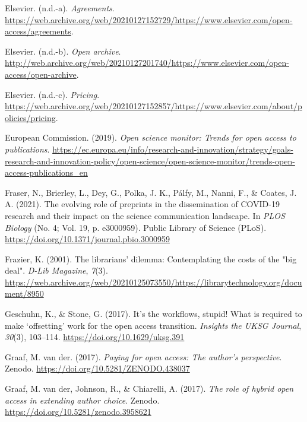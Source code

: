 \documentclass[a4paper,man,floatsintext,longtable,noextraspace,12pt]{apa6}
\newenvironment{CSLReferences}%
  {}%
  {\par}
\begin{document}
\begin{CSLReferences}{1}{0}
\leavevmode\hypertarget{ref-Els_Agreements}{}%
Elsevier. (n.d.-a). \emph{{Agreements}}.
\url{https://web.archive.org/web/20210127152729/https://www.elsevier.com/open-access/agreements}.

\leavevmode\hypertarget{ref-Els_Archive}{}%
Elsevier. (n.d.-b). \emph{{Open archive}}.
\url{http://web.archive.org/web/20210127201740/https://www.elsevier.com/open-access/open-archive}.

\leavevmode\hypertarget{ref-Els_Pricing}{}%
Elsevier. (n.d.-c). \emph{{Pricing}}.
\url{https://web.archive.org/web/20210127152857/https://www.elsevier.com/about/policies/pricing}.

\leavevmode\hypertarget{ref-OS_Monitor}{}%
European Commission. (2019). \emph{Open science monitor: Trends for open
access to publications}.
\url{https://ec.europa.eu/info/research-and-innovation/strategy/goals-research-and-innovation-policy/open-science/open-science-monitor/trends-open-access-publications_en}

\leavevmode\hypertarget{ref-Fraser_2020}{}%
Fraser, N., Brierley, L., Dey, G., Polka, J. K., Pálfy, M., Nanni, F.,
\& Coates, J. A. (2021). The evolving role of preprints in the
dissemination of {COVID}-19 research and their impact on the science
communication landscape. In \emph{{PLOS} Biology} (No. 4; Vol. 19, p.
e3000959). Public Library of Science ({PLoS}).
\url{https://doi.org/10.1371/journal.pbio.3000959}

\leavevmode\hypertarget{ref-Frazier_2001}{}%
Frazier, K. (2001). The librarians' dilemma: Contemplating the costs of
the "big deal". \emph{D-Lib Magazine}, \emph{7}(3).
\url{https://web.archive.org/web/20210125073550/https://librarytechnology.org/document/8950}

\leavevmode\hypertarget{ref-Geschuhn_2017}{}%
Geschuhn, K., \& Stone, G. (2017). It's the workflows, stupid! What is
required to make {`offsetting'} work for the open access transition.
\emph{Insights the {UKSG} Journal}, \emph{30}(3), 103--114.
\url{https://doi.org/10.1629/uksg.391}

\leavevmode\hypertarget{ref-Graaf_2017}{}%
Graaf, M. van der. (2017). \emph{Paying for open access: The author's
perspective}. Zenodo. \url{https://doi.org/10.5281/ZENODO.438037}

\leavevmode\hypertarget{ref-van_der_graaf_maurits_2017}{}%
Graaf, M. van der, Johnson, R., \& Chiarelli, A. (2017). \emph{The role
of hybrid open access in extending author choice}. Zenodo.
\url{https://doi.org/10.5281/zenodo.3958621}


\end{CSLReferences}
\end{document}
